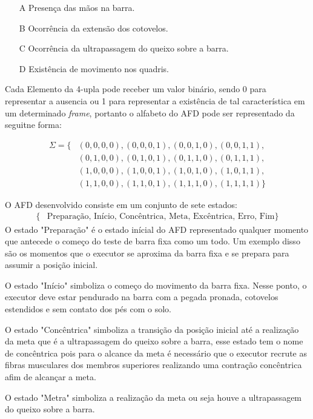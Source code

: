 \begin{itemize}
    \item[A] Presença das mãos na barra.
    \item[B] Ocorrência da extensão dos cotovelos.
    \item[C] Ocorrência da ultrapassagem do queixo sobre a barra.
    \item[D] Existência de movimento nos quadris.
\end{itemize} 

Cada Elemento da 4-upla pode receber um valor binário, sendo 0 para representar a ausencia  ou 1 para representar a existência de tal característica em um determinado \textit{frame}, portanto o alfabeto do \ac{AFD} pode ser representado da seguitne forma:


\[
\begin{aligned}
\Sigma = \{ &(0, 0, 0, 0), (0, 0, 0, 1), (0, 0, 1, 0), (0, 0, 1, 1), \\
            &(0, 1, 0, 0), (0, 1, 0, 1), (0, 1, 1, 0), (0, 1, 1, 1), \\
            &(1, 0, 0, 0), (1, 0, 0, 1), (1, 0, 1, 0), (1, 0, 1, 1), \\
            &(1, 1, 0, 0), (1, 1, 0, 1), (1, 1, 1, 0), (1, 1, 1, 1) \}
\end{aligned}
\]

O \ac{AFD} desenvolvido consiste em um conjunto de sete estados:
\[
\begin{aligned}
\{ &\text{Preparação, Início, Concêntrica, Meta, Excêntrica, Erro, Fim} \}
\end{aligned}
\]
O estado "Preparação" é o estado inícial do \ac{AFD} representado qualquer momento que antecede o começo do teste de barra fixa como um todo. Um exemplo disso são os momentos que o executor se aproxima da barra fixa e se prepara para assumir a posição inicial.

O estado "Início" simboliza o começo do movimento da barra fixa. Nesse ponto, o executor deve estar pendurado na barra com a pegada pronada, cotovelos estendidos e sem contato dos pés com o solo.

O estado "Concêntrica" simboliza a transição da posição inicial até a realização da meta que é a ultrapassagem do queixo sobre a barra, esse estado tem o nome de concêntrica pois para o alcance da meta é necessário que o executor recrute as fibras musculares dos membros superiores  realizando  uma contração concêntrica afim de alcançar a meta.

O estado "Metra" simboliza a realização da meta ou seja houve a ultrapassagem do queixo sobre a barra.

